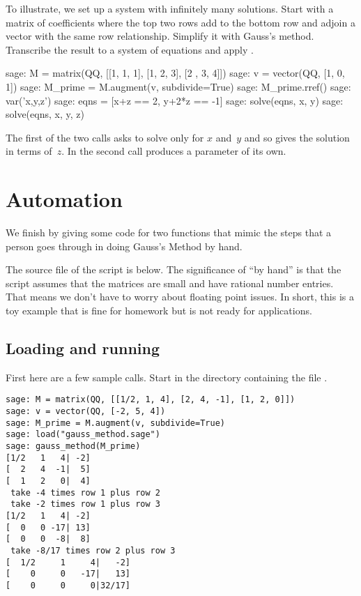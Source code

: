 To illustrate, we set up
a system with infinitely many solutions.
Start with a matrix of coefficients
where the top two rows add to the bottom row
and adjoin a vector with the same row relationship. 
Simplify it with Gauss's method.
Transcribe the result to a system of equations and apply .
\begin{sagecommandline}
sage: M = matrix(QQ, [[1, 1, 1], [1, 2, 3], [2 , 3, 4]])    
sage: v = vector(QQ, [1, 0, 1])                            
sage: M_prime = M.augment(v, subdivide=True)               
sage: M_prime.rref()
sage: var('x,y,z')          
sage: eqns = [x+z == 2, y+2*z == -1]
sage: solve(eqns, x, y)   
sage: solve(eqns, x, y, z)                                 
\end{sagecommandline}
The first of the two  calls asks  
to solve only for $x$ and~$y$ and so \Sage{} gives
the solution in terms of~$z$.
In the second call \Sage{} produces a parameter of its own.   




\section{Automation}

We finish by giving some \python{} code for two functions 
that mimic the steps that a person goes through in 
doing Gauss's Method by hand.

The source file of the script is below. 
The significance of ``by hand'' is that the script
assumes that the matrices are small and have rational number entries.
That means we don't have to worry about floating point issues.
In short, this is a toy example that is 
fine for homework but is not ready for applications.


\subsection{Loading and running}
First here are a few sample calls.
Start \Sage{} in the directory containing the file .
\begin{lstlisting}
sage: M = matrix(QQ, [[1/2, 1, 4], [2, 4, -1], [1, 2, 0]])
sage: v = vector(QQ, [-2, 5, 4])
sage: M_prime = M.augment(v, subdivide=True)
sage: load("gauss_method.sage")
sage: gauss_method(M_prime)
[1/2   1   4| -2]
[  2   4  -1|  5]
[  1   2   0|  4]
 take -4 times row 1 plus row 2
 take -2 times row 1 plus row 3
[1/2   1   4| -2]
[  0   0 -17| 13]
[  0   0  -8|  8]
 take -8/17 times row 2 plus row 3
[  1/2     1     4|   -2]
[    0     0   -17|   13]
[    0     0     0|32/17]
\end{lstlisting}

